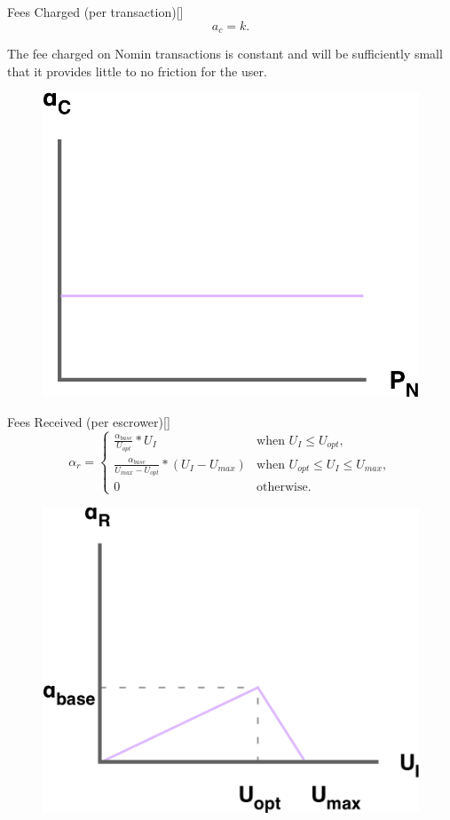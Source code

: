 \begin{namedthm}{Fees Charged (per transaction)}[]
$$ a_c = k.$$
\end{namedthm}

\noindent The fee charged on Nomin transactions is constant and will be sufficiently small that it provides little to no friction for the user. \\

\begin{figure}[h!]
    \centering
    \includegraphics[width=.55\textwidth]{img/fees-charged}
\end{figure}

\newpage

\begin{namedthm}{Fees Received (per escrower)}[]
\[
\alpha_r = 
\begin{cases}
 \frac{\alpha_{base}}{U_{opt}} * U_I &\mbox{when } U_I \leq U_{opt}, \\ 
 \frac{\alpha_{base}}{U_{max} - U_{opt}} * (U_I  - U_{max}) &\mbox{when } U_{opt} \leq U_I \leq U_{max}, \\ 
 0 &\mbox{otherwise}.
 \end{cases}
\]
\end{namedthm}

\begin{figure}[h!]
    \centering
    \includegraphics[width=.55\textwidth]{img/fees-received}
\end{figure}

